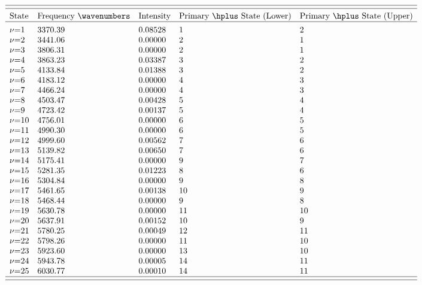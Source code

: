 %
%

\begin{table}[h]
\begin{center}
$$
\begin{array}{lllll}
 \hline \\ [-2ex]
 \hline \\ [-2ex]
 	\text{State} & \text{Frequency \wavenumbers} & \text{Intensity} & \text{Primary \hplus State (Lower)} & \text{Primary \hplus State (Upper)} \\
         \hline \\[-1.8ex]
         \text{$\nu $=1}  & 3370.39 & 0.08528 & 1  & 2   \\
         \text{$\nu $=2}  & 3441.06 & 0.00000 & 2  & 1   \\
         \text{$\nu $=3}  & 3806.31 & 0.00000 & 2  & 1   \\
         \text{$\nu $=4}  & 3863.23 & 0.03387 & 3  & 2   \\
         \text{$\nu $=5}  & 4133.84 & 0.01388 & 3  & 2   \\
         \text{$\nu $=6}  & 4183.12 & 0.00000 & 4  & 3   \\
         \text{$\nu $=7}  & 4466.24 & 0.00000 & 4  & 3   \\
         \text{$\nu $=8}  & 4503.47 & 0.00428 & 5  & 4   \\
         \text{$\nu $=9}  & 4723.42 & 0.00137 & 5  & 4   \\
         \text{$\nu $=10} & 4756.01 & 0.00000 & 6  & 5   \\
         \text{$\nu $=11} & 4990.30 & 0.00000 & 6  & 5   \\
         \text{$\nu $=12} & 4999.60 & 0.00562 & 7  & 6   \\
         \text{$\nu $=13} & 5139.82 & 0.00650 & 7  & 6   \\
         \text{$\nu $=14} & 5175.41 & 0.00000 & 9  & 7   \\
         \text{$\nu $=15} & 5281.35 & 0.01223 & 8  & 6   \\
         \text{$\nu $=16} & 5304.84 & 0.00000 & 9  & 8   \\
         \text{$\nu $=17} & 5461.65 & 0.00138 & 10 & 9   \\
         \text{$\nu $=18} & 5468.44 & 0.00000 & 9  & 8   \\
         \text{$\nu $=19} & 5630.78 & 0.00000 & 11 & 10  \\
         \text{$\nu $=20} & 5637.91 & 0.00152 & 10 & 9   \\
         \text{$\nu $=21} & 5780.25 & 0.00049 & 12 & 11  \\
         \text{$\nu $=22} & 5798.26 & 0.00000 & 11 & 10  \\
         \text{$\nu $=23} & 5923.60 & 0.00000 & 13 & 10  \\
         \text{$\nu $=24} & 5943.78 & 0.00005 & 14 & 11  \\
         \text{$\nu $=25} & 6030.77 & 0.00010 & 14 & 11  \\
         \hline \\ [-2ex]
 \hline
\end{array}
$$


\end{center}
\end{table}
